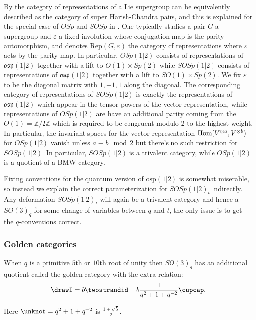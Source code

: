 \documentclass[12pt]{amsart}
\begin{document}
By \cite{MR2849718,MR3000482} the category of representations of a Lie supergroup can be equivalently described as the category  of super Harish-Chandra pairs, and this is explained for the special case of $OSp$ and $SOSp$ in \cite[\S 7.1]{MR3633307}.  One typically studies a pair $G$ a supergroup and $\varepsilon$ a fixed involution whose conjugation map is the parity automorphism, and denotes $\mathrm{Rep}(G,\varepsilon)$ the category of representations where $\varepsilon$ acts by the parity map.  In particular, $OSp(1|2)$ consists of representations of $\mathfrak{osp}(1|2)$ together with a lift to $O(1)\times Sp(2)$ while $SOSp(1|2)$ consists of representations of $\mathfrak{osp}(1|2)$ together with a lift to $SO(1)\times Sp(2)$.  We fix $\varepsilon$ to be the diagonal matrix with $1,-1,1$ along the diagonal.  The corresponding category  of representations of $SOSp(1|2)$ is exactly the representations of $\mathfrak{osp}(1|2)$ which appear in the tensor powers of the vector representation, while representations of $OSp(1|2)$ are have an additional parity coming from the $O(1) = \mathbb{Z}/2\mathbb{Z}$ which is required to be congruent modulo 2 to the highest weight.  In particular, the invariant spaces for the vector representation $\operatorname{Hom}(V^{\otimes a}, V^{\otimes b})$ for $OSp(1|2)$ vanish unless $a \equiv b \mod 2$ but there's no such restriction for $SOSp(1|2)$.   In particular, $SOSp(1|2)$ is a trivalent category, while $OSp(1|2)$ is a quotient of a BMW category.

Fixing conventions for the quantum version of $\mathrm{osp}(1|2)$ is somewhat miserable, so instead we explain the correct parameterization for $SOSp(1|2)_t$ indirectly.  Any deformation $SOSp(1|2)_t$ will again be a trivalent category and hence a $SO(3)_q$ for some change of variables between $q$ and $t$, the only issue is to get the $q$-conventions correct.  


\subsubsection{Golden categories}

\begin{definition}
When $q$ is a primitive $5$th or $10$th root of unity then $SO(3)_q$ has an additional quotient called the golden category with the extra relation:
$$\drawI = b \twostrandid - b \frac{1}{q^2+1+q^{-2}} \cupcap.$$

Here $\unknot = q^2+1+q^{-2}$ is $\frac{1\pm \sqrt{5}}{2}$.
\end{definition}
\end{document}
